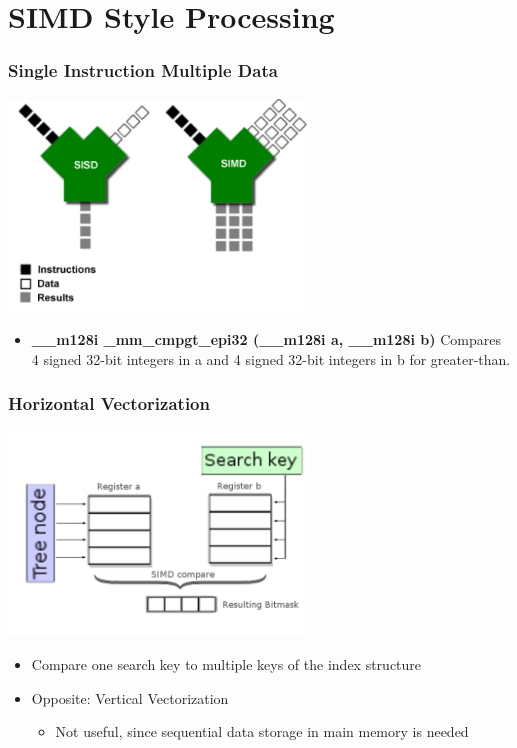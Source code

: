 \documentclass{beamer}
\begin{document}
\section{SIMD Style Processing}
\begin{frame}
\frametitle{Single Instruction Multiple Data}
\begin{center}
	\includegraphics[width=0.6\textwidth]{img/simd.png}
\end{center}
\begin{itemize}
	\item \textbf{\_\_m128i \_mm\_cmpgt\_epi32 (\_\_m128i a, \_\_m128i b)} Compares 4 signed 32-bit integers in a and 4 signed 32-bit integers
	in b for greater-than.
\end{itemize}
\end{frame}
\begin{frame}
\frametitle{Horizontal Vectorization}
\begin{center}
	\includegraphics[width=0.6\textwidth]{img/horizontal_vectorization.png}
\end{center}
\begin{itemize}
	\item Compare one search key to multiple keys of the index structure
	\item Opposite: Vertical Vectorization
	\begin{itemize}
		\item Not useful, since sequential data storage in main memory is needed
	\end{itemize}
\end{itemize}
\end{frame}
\end{document}
